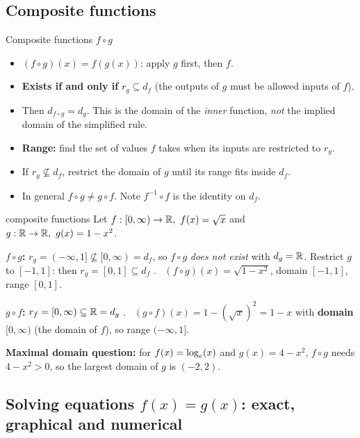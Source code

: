 \subsection{Composite functions}
\label{sec:composite}

\begin{keyres}{Composite functions $f\circ g$}
\begin{itemize}
  \item $(f\circ g)(x)=f(g(x))$: apply $g$ first, then $f$.
  \item \textbf{Exists if and only if} $r_g\subseteq d_f$ (the outputs of $g$ must be allowed inputs of $f$).
  \item Then \boldmath$d_{f\circ g}=d_g$\unboldmath. This is the domain of the \emph{inner} function, \emph{not} the implied domain of the simplified rule.
  \item \textbf{Range:} find the set of values $f$ takes when its inputs are restricted to $r_g$.
  \item If $r_g\not\subseteq d_f$, restrict the domain of $g$ until its range fits inside $d_f$.
  \item In general $f\circ g\ne g\circ f$. Note $f^{-1}\circ f$ is the identity on $d_f$.
\end{itemize}
\end{keyres}

\begin{example}{composite functions \byhand}
Let $f:[0,\infty)\to\mathbb{R},\ f(x)=\sqrt{x}$ and $g:\mathbb{R}\to\mathbb{R},\ g(x)=1-x^2$.\par
\textbf{$f\circ g$:} $r_g=(-\infty,1]\not\subseteq[0,\infty)=d_f$, so $f\circ g$ \emph{does not exist} with $d_g=\mathbb{R}$. Restrict $g$ to $[-1,1]$: then $r_g=[0,1]\subseteq d_f$ \tick. \ $(f\circ g)(x)=\sqrt{1-x^2}$, domain $[-1,1]$, range $[0,1]$.\par
\textbf{$g\circ f$:} $r_f=[0,\infty)\subseteq\mathbb{R}=d_g$ \tick. \ $(g\circ f)(x)=1-(\sqrt{x})^2=1-x$ with \textbf{domain $[0,\infty)$} (the domain of $f$), so range $(-\infty,1]$.\par
\textbf{Maximal domain question:} for $f(x)=\log_e(x)$ and $g(x)=4-x^2$, $f\circ g$ needs $4-x^2>0$, so the largest domain of $g$ is $(-2,2)$.
\end{example}

\subsection{Solving equations $f(x)=g(x)$: exact, graphical and numerical}
\label{sec:solve}

